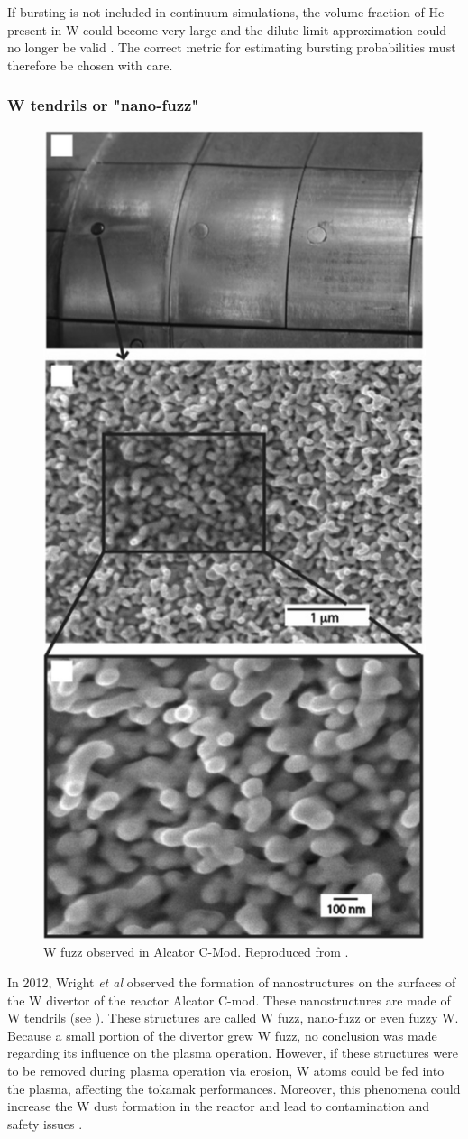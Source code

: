 If \gls{bursting} is not included in continuum simulations, the volume fraction of He present in W could become very large and the dilute limit approximation could no longer be valid .
The correct metric for estimating \gls{bursting} probabilities must therefore be chosen with care.

\subsubsection{W tendrils or "nano-fuzz"}

\begin{figure} [h!]
    \centering
    \includegraphics[width=0.5\linewidth]{Figures/Chapter1/fuzz_alcator_wright.jpg}
    \caption{W fuzz observed in Alcator C-Mod. Reproduced from \cite{wright_tungsten_2012}.}
\end{figure}

In 2012, Wright \textit{et al}  observed the formation of nanostructures on the surfaces of the W divertor of the reactor Alcator C-mod.
These nanostructures are made of W \glspl{tendril} (see ).
These structures are called W \gls{fuzz}, nano-fuzz or even fuzzy W.
Because a small portion of the \gls{divertor} grew W \gls{fuzz}, no conclusion was made regarding its influence on the \gls{plasma} operation.
However, if these structures were to be removed during \gls{plasma} operation via erosion, W atoms could be fed into the \gls{plasma}, affecting the \gls{tokamak} performances.
Moreover, this phenomena could increase the W dust formation in the reactor and lead to contamination and safety issues .

